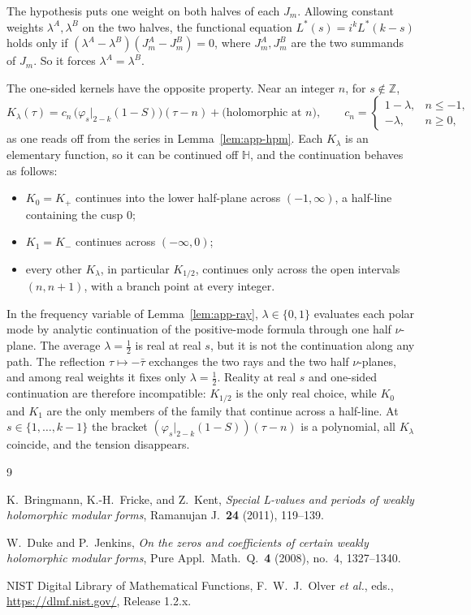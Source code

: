 \documentclass[11pt]{article}
\newcommand{\HH}{\mathbb{H}}
\newcommand{\ZZ}{\mathbb{Z}}
\begin{document}
The hypothesis puts one weight on both halves of each $J_m$. Allowing constant weights
$\lambda^A,\lambda^B$ on the two halves, the functional equation $L^*(s)=i^kL^*(k-s)$ holds only if
$(\lambda^A-\lambda^B)(J^A_m-J^B_m)=0$, where $J^A_m,J^B_m$ are the two summands of $J_m$. So it
forces $\lambda^A=\lambda^B$.

The one-sided kernels have the opposite property. Near an integer $n$, for $s\notin\ZZ$,
\[
K_\lambda(\tau)=c_n\,\big(\varphi_s|_{2-k}(1-S)\big)(\tau-n)+\big(\text{holomorphic at }n\big),\qquad
c_n=\begin{cases}1-\lambda,&n\le-1,\\-\lambda,&n\ge0,\end{cases}
\]
as one reads off from the series in Lemma~\ref{lem:app-hpm}. Each $K_\lambda$ is an elementary
function, so it can be continued off $\HH$, and the continuation behaves as follows:
\begin{itemize}
\item $K_0=K_+$ continues into the lower half-plane across $(-1,\infty)$, a half-line containing
the cusp $0$;
\item $K_1=K_-$ continues across $(-\infty,0)$;
\item every other $K_\lambda$, in particular $K_{1/2}$, continues only across the open intervals
$(n,n+1)$, with a branch point at every integer.
\end{itemize}
In the frequency variable of Lemma~\ref{lem:app-ray}, $\lambda\in\{0,1\}$ evaluates each polar mode
by analytic continuation of the positive-mode formula through one half $\nu$-plane. The average
$\lambda=\frac12$ is real at real $s$, but it is not the continuation along any path. The
reflection $\tau\mapsto-\bar\tau$ exchanges the two rays and the two half $\nu$-planes, and among
real weights it fixes only $\lambda=\frac12$. Reality at real $s$ and one-sided continuation are
therefore incompatible: $K_{1/2}$ is the only real choice, while $K_0$ and $K_1$ are the only members
of the family that continue across a half-line. At $s\in\{1,\dots,k-1\}$ the bracket
$(\varphi_s|_{2-k}(1-S))(\tau-n)$ is a polynomial, all $K_\lambda$ coincide, and the tension
disappears.


\begin{thebibliography}{9}

K.\ Bringmann, K.-H.\ Fricke, and Z.\ Kent,
\emph{Special L-values and periods of weakly holomorphic modular forms},
Ramanujan J.\ \textbf{24} (2011), 119--139.

W.\ Duke and P.\ Jenkins,
\emph{On the zeros and coefficients of certain weakly holomorphic modular forms},
Pure Appl.\ Math.\ Q.\ \textbf{4} (2008), no.\ 4, 1327--1340.

NIST Digital Library of Mathematical Functions,
F.~W.~J.\ Olver \emph{et al.}, eds.,
\url{https://dlmf.nist.gov/}, Release 1.2.x.

\end{thebibliography}
\end{document}
